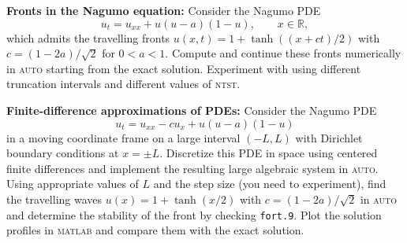 \documentclass[10pt]{article}
\newcommand{\R}{\mathbb{R}}
\begin{document}
\underline{\hspace*{\textwidth}}

\textbf{Fronts in the Nagumo equation:}
Consider the Nagumo PDE
\[
u_t = u_{xx} + u(u-a)(1-u), \qquad x\in\R,
\]
which admits the travelling fronts $u(x,t)=1+\tanh((x+ct)/2)$ with $c=(1-2a)/\sqrt{2}$ for $0<a<1$. Compute and continue these fronts numerically in \textsc{auto} starting from the exact solution. Experiment with using different truncation intervals and different values of \textsc{ntst}.

\underline{\hspace*{\textwidth}}

\textbf{Finite-difference approximations of PDEs:}
Consider the Nagumo PDE
\[
u_t = u_{xx} - cu_x + u(u-a)(1-u)
\]
in a moving coordinate frame on a large interval $(-L,L)$ with Dirichlet boundary conditions at $x=\pm L$. Discretize this PDE in space using centered finite differences and implement the resulting large algebraic system in \textsc{auto}. Using appropriate values of $L$ and the step size (you need to experiment), find the travelling waves $u(x)=1+\tanh(x/2)$ with $c=(1-2a)/\sqrt{2}$ in \textsc{auto} and determine the stability of the front by checking \texttt{fort.9}. Plot the solution profiles in \textsc{matlab} and compare them with the exact solution.

\underline{\hspace*{\textwidth}}

\end{document}
